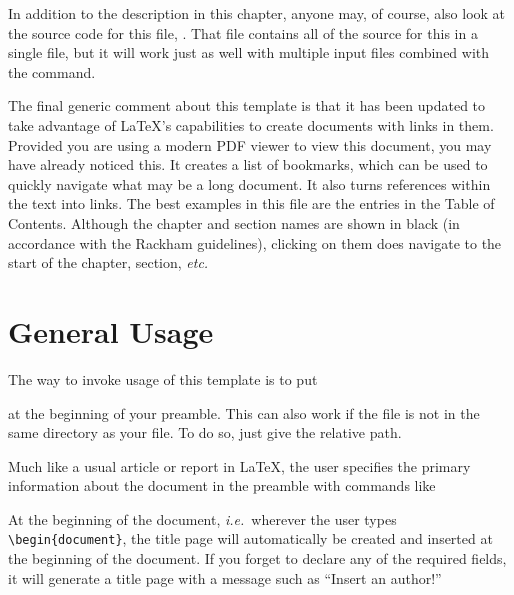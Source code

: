 \documentclass[thesis]{./tex/thesis-umich}
\begin{document}
In addition to the description in this chapter, anyone may, of course,
also look at the source code for this file, .
That file contains all of the source for this  in a single
file, but it will work just as well with multiple input files combined
with the \verb|| command.

The final generic comment about this template is that it has been
updated to take advantage of \LaTeX's capabilities to create documents
with links in them.  Provided you are using a modern PDF viewer to view
this document, you may have already noticed this.  It creates a list of
bookmarks, which can be used to quickly navigate what may be a long
document.  It also turns references within the text into links.  The
best examples in this file are the entries in the Table of Contents.
Although the chapter and section names are shown in black (in accordance
with the Rackham guidelines), clicking on them does navigate to the
start of the chapter, section, \textit{etc.}

\section{General Usage}
The way to invoke usage of this template is to put
at the beginning of your preamble.  This can also work if the
 file is not in the same directory as your
 file.  To do so, just give the relative path.

Much like a usual article or report in \LaTeX, the user specifies the
primary information about the document in the preamble with commands
like
\begin{code}
\author{Derek J. Dalle}
\end{code}
At the beginning of the document, \textit{i.e.}~wherever the user
types \verb|\begin{document}|, the title page will automatically be
created and inserted at the beginning of the document.  If you
forget to declare any of the required fields, it will generate a
title page with a message such as ``Insert an author!''
\end{document}
